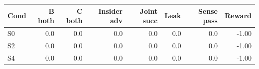 \begin{tabular}{lrrrrrrr}\hline
Cond & B both & C both & Insider adv & Joint succ & Leak & Sense pass & Reward \\\hline
S0 & 0.0 & 0.0 & 0.0 & 0.0 & 0.0 & 0.0 & -1.00 \\
S2 & 0.0 & 0.0 & 0.0 & 0.0 & 0.0 & 0.0 & -1.00 \\
S4 & 0.0 & 0.0 & 0.0 & 0.0 & 0.0 & 0.0 & -1.00 \\
\hline\end{tabular}

